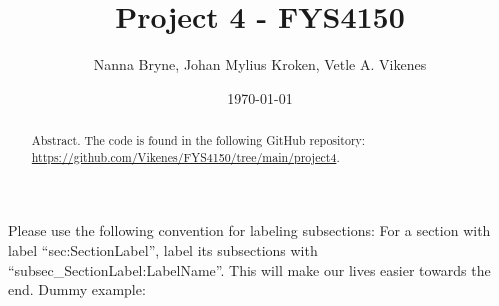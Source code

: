 



\title{Project 4 - FYS4150} 
\author{Nanna Bryne, Johan Mylius Kroken, Vetle A. Vikenes} 
\date{\today}                             
\noaffiliation                            

\begin{abstract}
    Abstract. The code is found in the following GitHub repository: \url{https://github.com/Vikenes/FYS4150/tree/main/project4}.
\end{abstract}
\maketitle


\alert{Please use the following convention for labeling subsections: For a section with label ``sec:SectionLabel'', label its subsections with ``subsec\_SectionLabel:LabelName''. This will make our lives easier towards the end. Dummy example:}


  

   















 



